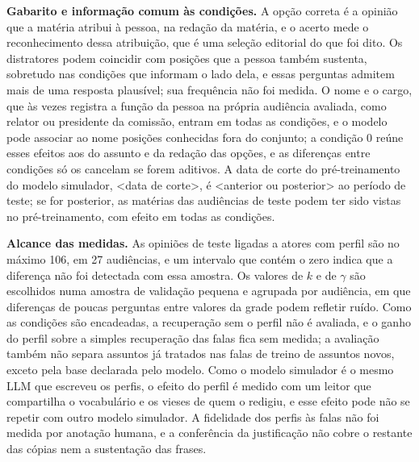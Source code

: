 \textbf{Gabarito e informação comum às condições.} A opção correta é a opinião que a matéria atribui à
pessoa, na redação da matéria, e o acerto mede o reconhecimento dessa atribuição, que é uma seleção
editorial do que foi dito. Os distratores podem coincidir com posições que a pessoa também sustenta,
sobretudo nas condições que informam o lado dela, e essas perguntas admitem mais de uma resposta
plausível; sua frequência não foi medida. O nome e o cargo, que às vezes registra a função da pessoa
na própria audiência avaliada, como relator ou presidente da comissão, entram em todas as condições,
e o modelo pode associar ao nome posições conhecidas fora do conjunto; a condição 0 reúne esses
efeitos aos do assunto e da redação das opções, e as diferenças entre condições só os cancelam se
forem aditivos. A data de corte do pré-treinamento do modelo simulador, <data de corte>, é <anterior
ou posterior> ao período de teste; se for posterior, as matérias das audiências de teste podem ter
sido vistas no pré-treinamento, com efeito em todas as condições.

\textbf{Alcance das medidas.} As opiniões de teste ligadas a atores com perfil são no máximo 106, em
27 audiências, e um intervalo que contém o zero indica que a diferença não foi detectada com essa
amostra. Os valores de $k$ e de $\gamma$ são escolhidos numa amostra de validação pequena e agrupada
por audiência, em que diferenças de poucas perguntas entre valores da grade podem refletir ruído. Como
as condições são encadeadas, a recuperação sem o perfil não é avaliada, e o ganho do perfil sobre a
simples recuperação das falas fica sem medida; a avaliação também não separa assuntos já tratados nas
falas de treino de assuntos novos, exceto pela base declarada pelo modelo. Como o modelo simulador é o
mesmo LLM que escreveu os perfis, o efeito do perfil é medido com um leitor que compartilha o
vocabulário e os vieses de quem o redigiu, e esse efeito pode não se repetir com outro modelo
simulador. A fidelidade dos perfis às falas não foi medida por anotação humana, e a conferência da
justificação não cobre o restante das cópias nem a sustentação das frases.
